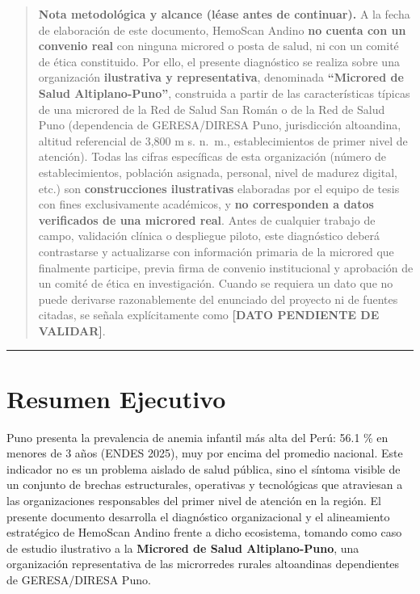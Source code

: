 \documentclass[11pt,a4paper]{article}
\begin{document}
\begin{quote}
\textbf{Nota metodológica y alcance (léase antes de continuar).} A la fecha de elaboración de este documento, HemoScan Andino \textbf{no cuenta con un convenio real} con ninguna microred o posta de salud, ni con un comité de ética constituido. Por ello, el presente diagnóstico se realiza sobre una organización \textbf{ilustrativa y representativa}, denominada \textbf{``Microred de Salud Altiplano-Puno''}, construida a partir de las características típicas de una microred de la Red de Salud San Román o de la Red de Salud Puno (dependencia de GERESA/DIRESA Puno, jurisdicción altoandina, altitud referencial de 3,800 m s. n.~m., establecimientos de primer nivel de atención). Todas las cifras específicas de esta organización (número de establecimientos, población asignada, personal, nivel de madurez digital, etc.) son \textbf{construcciones ilustrativas} elaboradas por el equipo de tesis con fines exclusivamente académicos, y \textbf{no corresponden a datos verificados de una microred real}. Antes de cualquier trabajo de campo, validación clínica o despliegue piloto, este diagnóstico deberá contrastarse y actualizarse con información primaria de la microred que finalmente participe, previa firma de convenio institucional y aprobación de un comité de ética en investigación. Cuando se requiera un dato que no puede derivarse razonablemente del enunciado del proyecto ni de fuentes citadas, se señala explícitamente como \textbf{{[}DATO PENDIENTE DE VALIDAR{]}}.
\end{quote}

\begin{center}\rule{0.5\linewidth}{0.5pt}\end{center}

\section{Resumen Ejecutivo}\label{resumen-ejecutivo}

Puno presenta la prevalencia de anemia infantil más alta del Perú: 56.1 \% en menores de 3 años (ENDES 2025), muy por encima del promedio nacional. Este indicador no es un problema aislado de salud pública, sino el síntoma visible de un conjunto de brechas estructurales, operativas y tecnológicas que atraviesan a las organizaciones responsables del primer nivel de atención en la región. El presente documento desarrolla el diagnóstico organizacional y el alineamiento estratégico de HemoScan Andino frente a dicho ecosistema, tomando como caso de estudio ilustrativo a la \textbf{Microred de Salud Altiplano-Puno}, una organización representativa de las microrredes rurales altoandinas dependientes de GERESA/DIRESA Puno.
\end{document}
